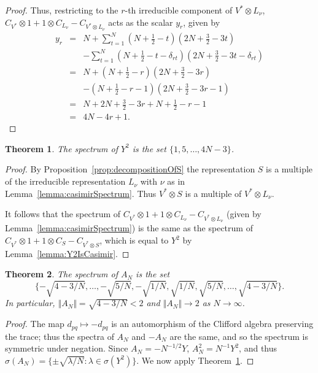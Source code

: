 \documentclass[11pt]{article}
\newtheorem{theorem}{Theorem}
\newcommand{\myd}{d}
\begin{document}
\begin{proof}
Thus, restricting to the $r$-th irreducible component of $V^*\otimes L_\nu$, $C_{V^*}\otimes 1 + 1\otimes C_{L_\nu} - C_{V^*\otimes L_\nu } $ acts as the scalar $y_r$, given by 
\begin{eqnarray*}
    y_r &=& N + \sum_{t=1}^N (N+\frac{1}{2}-t)(2N+\frac{3}{2}-3t) 
    \\ && - \sum_{t=1}^N (N+\frac{1}{2}-t -\delta_{rt})(2N+\frac{3}{2}-3t-\delta_{rt}) \\
    &=& N + (N+\frac{1}{2}-r)(2N+\frac{3}{2}-3r) 
    \\ && - (N+\frac{1}{2}-r-1)(2N+ \frac{3}{2}-3r-1) \\
    &=& N + 2N+\frac{3}{2}-3r + N+ \frac{1}{2}-r - 1 \\
    &=& 4N-4r+1.
\end{eqnarray*}
\end{proof}

\begin{theorem}\label{thrm:spectrumOfY}
    The spectrum of $Y^2$ is the set $\{1,5,\dots,4N-3\}$. 
\end{theorem}
\begin{proof}
By Proposition~\ref{prop:decompositionOfS} the representation $S$ is a multiple of the irreducible representation $L_\nu$ with $\nu$ as in Lemma~\ref{lemma:casimirSpectrum}. Thus  $V^*\otimes S$ is a multiple of $V^*\otimes L_\nu$.   

It follows that the spectrum of  $C_{V^*} \otimes 1 + 1\otimes C_{L_\nu} - C_{V^*\otimes L_\nu}$ (given by Lemma~\ref{lemma:casimirSpectrum}) is the same as the spectrum of $C_{V^*}\otimes 1 + 1\otimes C_{S} - C_{V^*\otimes S}$, which is equal to $Y^2$ by Lemma~\ref{lemma:Y2IsCasimir}.
\end{proof}

\begin{theorem}\label{thrm:spectrumOfA}
    The spectrum of $A_N$ is the set  $$\{-\sqrt{4-3/N},\dots,-\sqrt{5/N},-\sqrt{1/N},\sqrt{1/N},\sqrt{5/N},\dots,\sqrt{4-3/N}\}.$$
    In particular, $\Vert A_N\Vert = \sqrt{4-3/N} <2$ and $\Vert A_N\Vert\to 2$ as $N\to\infty$.
\end{theorem}
\begin{proof}
    The map $\myd_{pq}\mapsto -\myd_{pq}$ is an automorphism of the Clifford algebra preserving the trace; thus the spectra of $A_N$ and $-A_N$ are the same, and so the spectrum is symmetric under negation.  Since $A_N=-N^{-1/2}Y$, $A_N^2 = N^{-1}Y^2$, and thus $\sigma(A_N)=\{\pm\sqrt{\lambda/N}:\lambda\in\sigma(Y^2)\}$. We now apply Theorem~\ref{thrm:spectrumOfY}.
\end{proof}
\end{document}
